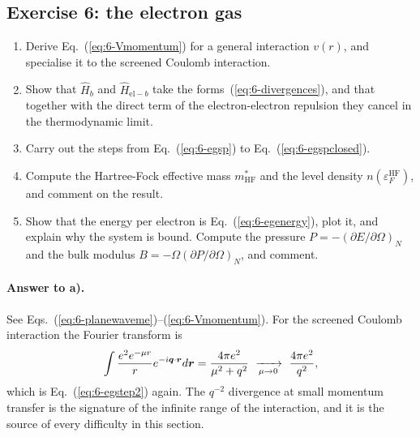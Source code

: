 \subsection*{Exercise 6: the electron gas}
\label{ex:6-electrongas}

\begin{enumerate}
  \item[a)] Derive Eq.~(\ref{eq:6-Vmomentum}) for a general interaction
  $v(r)$, and specialise it to the screened Coulomb interaction.
  \item[b)] Show that $\hat{H}_b$ and $\hat{H}_{\mathrm{el}-b}$ take the
  forms~(\ref{eq:6-divergences}), and that together with the direct term of
  the electron-electron repulsion they cancel in the thermodynamic limit.
  \item[c)] Carry out the steps from Eq.~(\ref{eq:6-egsp}) to
  Eq.~(\ref{eq:6-egspclosed}).
  \item[d)] Compute the Hartree-Fock effective mass $m^{*}_{\mathrm{HF}}$ and
  the level density $n(\varepsilon_F^{\mathrm{HF}})$, and comment on the
  result.
  \item[e)] Show that the energy per electron is
  Eq.~(\ref{eq:6-egenergy}), plot it, and explain why the system is bound.
  Compute the pressure $P=-(\partial E/\partial\Omega)_N$ and the bulk
  modulus $B=-\Omega(\partial P/\partial\Omega)_N$, and comment.
\end{enumerate}

\paragraph{Answer to a).}
See Eqs.~(\ref{eq:6-planewaveme})--(\ref{eq:6-Vmomentum}).  For the screened
Coulomb interaction the Fourier transform is
\begin{equation}
  \int \frac{e^2e^{-\mu r}}{r}e^{-i\bm{q}\cdot\bm{r}}d\bm{r}
  = \frac{4\pi e^2}{\mu^2+q^2}
  \ \xrightarrow[\mu\to0]{}\ \frac{4\pi e^2}{q^2},
  \label{eq:6-exa6}
\end{equation}
which is Eq.~(\ref{eq:6-egstep2}) again.  The $q^{-2}$ divergence at small
momentum transfer is the signature of the infinite range of the interaction,
and it is the source of every difficulty in this section.

